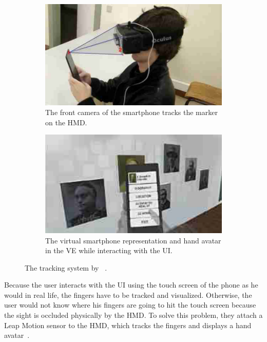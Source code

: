 \begin{figure}[H]
	\centering
	\begin{subfigure}[t]{0.48\textwidth}%
		\includegraphics[width=\textwidth]{figures/related_work/dias_2018_tracking.png}
		\caption{The front camera of the smartphone tracks the marker on the \gls{HMD}.}\label{fig:dias-2018-tracking}%
	\end{subfigure}%
	\hspace{0.04\textwidth}%
	\begin{subfigure}[t]{0.48\textwidth}%
		\includegraphics[width=\textwidth]{figures/related_work/dias_2018_virtual_smartphone.png}
		\caption{The virtual smartphone representation and hand avatar in the \gls{VE} while interacting with the \gls{UI}.}\label{fig:dias-2018-virtual-smartphone}
	\end{subfigure}%
	\caption[Tracking setup by Dias et al.]{The tracking system by \citeauthor{Dias.2018}~\protect\cite[4,5]{Dias.2018}.}\label{fig:dias-2018}
\end{figure}

Because the user interacts with the \gls{UI} using the touch screen of the phone as he would in real life, the fingers have to be tracked and visualized. Otherwise, the user would not know where his fingers are going to hit the touch screen because the sight is occluded physically by the \gls{HMD}. To solve this problem, they attach a Leap Motion sensor to the \gls{HMD}, which tracks the fingers and displays a hand avatar~\cite{Dias.2018}.

